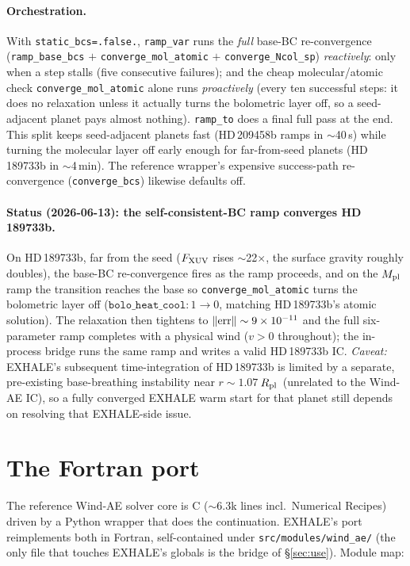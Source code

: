 \documentclass[english,a4paper]{my_memo}
\newcommand{\Rp}{\ensuremath{R_{\rm pl}}}
\newcommand{\code}[1]{\texttt{#1}}
\begin{document}
\paragraph{Orchestration.} With \code{static\_bcs=.false.},
\code{ramp\_var} runs the \emph{full} base-BC re-convergence
(\code{ramp\_base\_bcs} $+$ \code{converge\_mol\_atomic} $+$
\code{converge\_Ncol\_sp})
\emph{reactively}: only when a step stalls (five consecutive failures);
and the cheap molecular/atomic check \code{converge\_mol\_atomic} alone runs
\emph{proactively} (every ten successful steps: it does no relaxation
unless it actually turns the bolometric layer off, so a seed-adjacent planet
pays almost nothing). \code{ramp\_to} does a final full pass at the end.
This split keeps seed-adjacent planets fast (HD\,209458b ramps in
$\sim$40\,s) while turning the molecular layer off early enough for
far-from-seed planets (HD\,189733b in $\sim$4\,min). The reference wrapper's
expensive success-path re-convergence (\code{converge\_bcs}) likewise
defaults off.

\paragraph{Status (2026-06-13): the self-consistent-BC ramp converges HD\,189733b.} On
HD\,189733b, far from the seed ($F_{\rm XUV}$ rises $\sim$22$\times$, the
surface gravity roughly doubles), the base-BC re-convergence fires as the
ramp proceeds, and on the $M_{\rm pl}$ ramp the transition reaches the base
so \code{converge\_mol\_atomic} turns the bolometric layer off
($\code{bolo\_heat\_cool}:1\to0$, matching HD\,189733b's atomic solution).
The relaxation then tightens to $\|{\rm err}\|\sim9\times10^{-11}$ and the
full six-parameter ramp completes with a physical wind ($v>0$ throughout);
the in-process bridge runs the same ramp and writes a valid HD\,189733b IC.
\emph{Caveat:} EXHALE's subsequent time-integration of HD\,189733b is
limited by a separate, pre-existing base-breathing instability near
$r\sim1.07\,$\Rp\ (unrelated to the Wind-AE IC), so a fully converged EXHALE
warm start for that planet still depends on resolving that EXHALE-side issue.

\section{The Fortran port}
The reference Wind-AE solver core is C ($\sim$6.3k lines incl.\ Numerical
Recipes) driven by a Python wrapper that does the continuation. EXHALE's
port reimplements both in Fortran, self-contained under
\code{src/modules/wind\_ae/} (the only file that touches EXHALE's globals
is the bridge of \S\ref{sec:use}). Module map:
\end{document}
